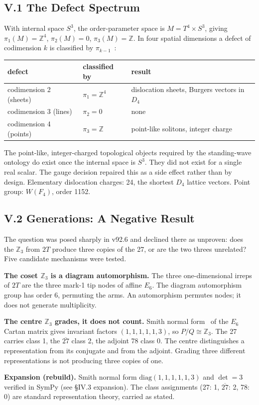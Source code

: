 \documentclass[11pt,a4paper]{article}
\newcommand{\expansion}[1]{\par\smallskip\noindent\textbf{Expansion (rebuild).} #1\par\smallskip}
\begin{document}
\subsection{V.1 The Defect Spectrum}
With internal space $S^3$, the order-parameter space is $M = T^4 \times S^3$, giving $\pi_1(M) = \mathbb{Z}^4$, $\pi_2(M) = 0$, $\pi_3(M) = \mathbb{Z}$. In four spatial dimensions a defect of codimension $k$ is classified by $\pi_{k-1}$~\cite{mermin1979}:
\begin{center}
\begin{tabular}{lll}
\toprule
defect & classified by & result \\
\midrule
codimension 2 (sheets) & $\pi_1 = \mathbb{Z}^4$ & dislocation sheets, Burgers vectors in $D_4$ \\
codimension 3 (lines) & $\pi_2 = 0$ & none \\
codimension 4 (points) & $\pi_3 = \mathbb{Z}$ & point-like solitons, integer charge \\
\bottomrule
\end{tabular}
\end{center}
The point-like, integer-charged topological objects required by the standing-wave ontology do exist once the internal space is $S^3$. They did not exist for a single real scalar. The gauge decision repaired this as a side effect rather than by design. Elementary dislocation charges: 24, the shortest $D_4$ lattice vectors. Point group: $W(F_4)$, order 1152.

\subsection{V.2 Generations: A Negative Result}
The question was posed sharply in v92.6 and declined there as unproven: does the $\mathbb{Z}_3$ from $2T$ produce three copies of the 27, or are the two threes unrelated? Five candidate mechanisms were tested.

\textbf{The coset $\mathbb{Z}_3$ is a diagram automorphism.} The three one-dimensional irreps of $2T$ are the three mark-1 tip nodes of affine $E_6$. The diagram automorphism group has order 6, permuting the arms. An automorphism permutes nodes; it does not generate multiplicity.

\textbf{The centre $\mathbb{Z}_3$ grades, it does not count.} Smith normal form~\cite{newman1972} of the $E_6$ Cartan matrix gives invariant factors $(1,1,1,1,1,3)$, so $P/Q \cong \mathbb{Z}_3$. The 27 carries class 1, the $\overline{27}$ class 2, the adjoint 78 class 0. The centre distinguishes a representation from its conjugate and from the adjoint. Grading three different representations is not producing three copies of one.
\expansion{Smith normal form $\mathrm{diag}(1,1,1,1,1,3)$ and $\det = 3$ verified in SymPy (see \S IV.3 expansion). The class assignments (27: 1, $\overline{27}$: 2, 78: 0) are standard representation theory, carried as stated.}
\end{document}
